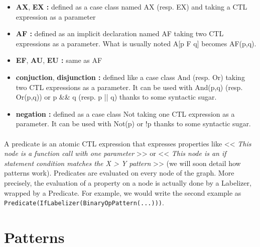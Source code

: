 \documentclass{report}
\begin{document}
\vspace{1.5mm}
\begin{itemize}
\item \textbf{AX}, \textbf{EX :} defined as a case class named AX (resp. EX) and taking a CTL expression as a parameter\vspace{1mm}
\item \textbf{AF :} defined as an implicit declaration named AF taking two CTL expressions as a parameter. What is usually noted A[p F q] becomes AF(p,q).\vspace{1mm}
\item \textbf{EF}, \textbf{AU}, \textbf{EU :} same as AF\vspace{1mm}
\item \textbf{conjuction}, \textbf{disjunction :} defined like a case class And (resp. Or) taking two CTL expressions as a parameter. It can be used with And(p,q) (resp. Or(p,q)) or p \&\& q (resp. p || q) thanks to some syntactic sugar.\vspace{1mm}
\item \textbf{negation :} defined as a case class Not taking one CTL expression as a parameter. It can be used with Not(p) or !p thanks to some syntactic sugar.\vspace{1mm}
\end{itemize}

\paragraph{}
\hspace{4mm}A predicate is an atomic CTL expression that expresses properties
 like << \textit{This node is a function call with one parameter} >> or  << \textit{This node is an if statement condition matches the X > Y pattern} >> (we will soon detail
how patterns work). Predicates are evaluated on every node of the graph. More precisely, the evaluation of a property on a node
is actually done by a Labelizer, wrapped by a Predicate. For example, we would write the second example as \lstinline|Predicate(IfLabelizer(BinaryOpPattern(...)))|.

\section{Patterns}
\end{document}
